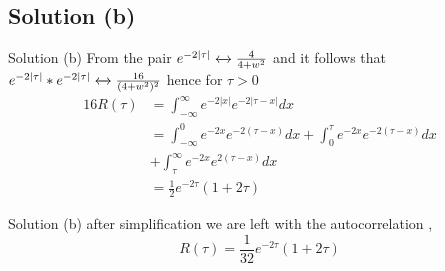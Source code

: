 \documentclass{beamer}
\begin{document}
  \subsection{Solution (b)}
  \begin{frame}{Solution (b)}
      From the pair $e^{-2|\tau|} \xleftrightarrow \ \frac{4}{4+w^{2}}$ and it follows that
      $e^{-2|\tau|}*e^{-2|\tau|} \xleftrightarrow \ \frac{16}{(4+w^{2})^{2}}$ hence for $\tau>0$
      \begin{align*}
          16 R(\tau) &= \int_{-\infty}^{\infty} e^{-2|x|}e^{-2|\tau-x|} dx  \\
          &= \int_{-\infty}^{0} e^{-2x}e^{-2(\tau-x)} dx +\int_{0}^{\tau} e^{-2x}e^{-2(\tau-x)} dx  \\
          &+ \int_{\tau}^{\infty} e^{-2x}e^{2(\tau-x)} dx \\
          &=  \frac{1}{2}e^{-2\tau}(1+2\tau)
      \end{align*}
  \end{frame}
  
  \begin{frame}{Solution (b)}
      after simplification we are left with the autocorrelation ,
      $$R (\tau) = \frac{1}{32}e^{-2\tau}(1+2\tau) $$
  \end{frame}
  
\end{document}
